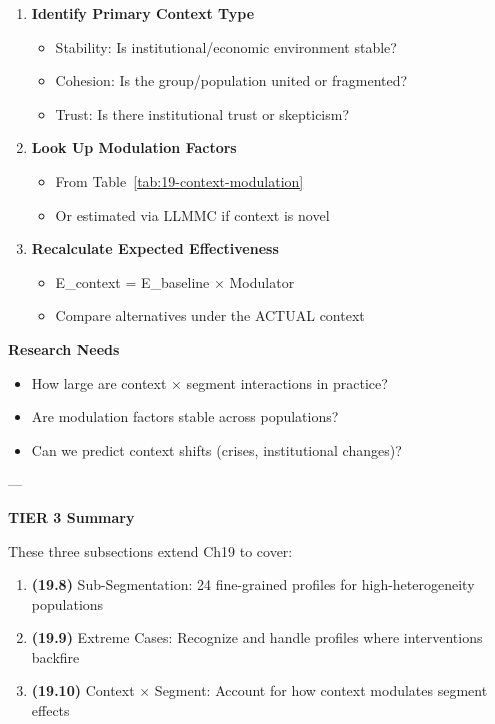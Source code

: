 \begin{enumerate}
\item \textbf{Identify Primary Context Type}
  \begin{itemize}[nosep]
  \item Stability: Is institutional/economic environment stable?
  \item Cohesion: Is the group/population united or fragmented?
  \item Trust: Is there institutional trust or skepticism?
  \end{itemize}

\item \textbf{Look Up Modulation Factors}
  \begin{itemize}[nosep]
  \item From Table~\ref{tab:19-context-modulation}
  \item Or estimated via LLMMC if context is novel
  \end{itemize}

\item \textbf{Recalculate Expected Effectiveness}
  \begin{itemize}[nosep]
  \item E_context = E_baseline × Modulator
  \item Compare alternatives under the ACTUAL context
  \end{itemize}
\end{enumerate}

\textbf{Research Needs}

\begin{itemize}[nosep]
\item How large are context × segment interactions in practice?
\item Are modulation factors stable across populations?
\item Can we predict context shifts (crises, institutional changes)?
\end{itemize}

---

\textbf{TIER 3 Summary}

These three subsections extend Ch19 to cover:
\begin{enumerate}[nosep]
\item \textbf{(19.8)} Sub-Segmentation: 24 fine-grained profiles for high-heterogeneity populations
\item \textbf{(19.9)} Extreme Cases: Recognize and handle profiles where interventions backfire
\item \textbf{(19.10)} Context × Segment: Account for how context modulates segment effects
\end{enumerate}

